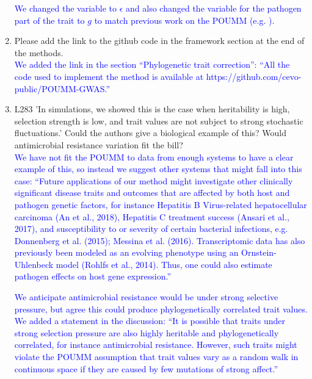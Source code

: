 \documentclass[11pt]{article}
\begin{document}
\begin{enumerate}
    \textcolor{blue}{We changed the variable to $\epsilon$ and also changed the variable for the pathogen part of the trait to $g$ to match previous work on the POUMM (e.g. \citep{Mitov2017a-POUMM})}.
    \item Please add the link to the github code in the framework section at the end of the methods.\\
    \textcolor{blue}{We added the link in the section ``Phylogenetic trait correction'': ``All the code used to implement the method is available at https://github.com/cevo-public/POUMM-GWAS.''}
    \item L283 'In simulations, we showed this is the case when heritability is high, selection strength is low, and trait values are not subject to strong stochastic fluctuations.' Could the authors give a biological example of this? Would antimicrobial resistance variation fit the bill?\\
    \textcolor{blue}{We have not fit the POUMM to data from enough systems to have a clear example of this, so instead we suggest other systems that might fall into this case: ``Future applications of our method might investigate other clinically significant disease traits and outcomes that are affected by both host and pathogen genetic factors, for instance Hepatitis B Virus-related hepatocellular carcinoma (An et al., 2018), Hepatitis C treatment success (Ansari et al., 2017), and susceptibility to or severity of certain bacterial infections, e.g. Donnenberg et al. (2015); Messina et al. (2016). Transcriptomic data has also previously been modeled as an evolving phenotype using an Ornstein-Uhlenbeck model (Rohlfs et al., 2014). Thus, one could also estimate pathogen effects on host gene expression.''}
    
    \textcolor{blue}{We anticipate antimicrobial resistance would be under strong selective pressure, but agree this could produce phylogenetically correlated trait values. We added a statement in the discussion: ``It is possible that traits under strong selection pressure are also highly heritable and phylogenetically correlated, for instance antimicrobial resistance. However, such traits might violate the POUMM assumption that trait values vary as a random walk in continuous space if they are caused by few mutations of strong affect.''}
\end{enumerate}
\end{document}
